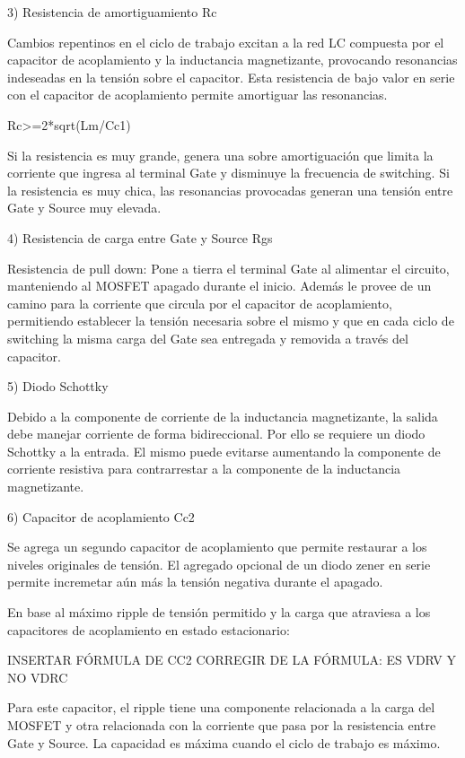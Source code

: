 3) Resistencia de amortiguamiento Rc

Cambios repentinos en el ciclo de trabajo excitan a la red LC compuesta por el capacitor de acoplamiento 
y la inductancia magnetizante, provocando resonancias indeseadas en la tensión sobre el capacitor. 
Esta resistencia de bajo valor en serie con el capacitor de acoplamiento permite amortiguar las resonancias. 

Rc>=2*sqrt(Lm/Cc1)

Si la resistencia es muy grande, genera una sobre amortiguación que limita la corriente que ingresa al terminal Gate y disminuye la frecuencia de switching. 
Si la resistencia es muy chica, las resonancias provocadas generan una tensión entre Gate y Source muy elevada.

4) Resistencia de carga entre Gate y Source Rgs

Resistencia de pull down: Pone a tierra el terminal Gate al alimentar el circuito, manteniendo al MOSFET apagado durante el inicio. 
Además le provee de un camino para la corriente que circula por el capacitor de acoplamiento, 
permitiendo establecer la tensión necesaria sobre el mismo y que en cada ciclo de switching 
la misma carga del Gate sea entregada y removida a través del capacitor. 

5) Diodo Schottky 

Debido a la componente de corriente de la inductancia magnetizante, la salida debe manejar corriente de forma bidireccional. 
Por ello se requiere un diodo Schottky a la entrada. 
El mismo puede evitarse aumentando la componente de corriente resistiva para contrarrestar a la componente de la inductancia magnetizante. 

6) Capacitor de acoplamiento Cc2  

Se agrega un segundo capacitor de acoplamiento que permite restaurar a los niveles originales de tensión. 
El agregado opcional de un diodo zener en serie permite incremetar aún más la tensión negativa durante el apagado. 

En base al máximo ripple de tensión permitido y la carga que atraviesa a los capacitores de acoplamiento en estado estacionario:

INSERTAR FÓRMULA DE CC2 
CORREGIR DE LA FÓRMULA: ES VDRV Y NO VDRC

Para este capacitor, el ripple tiene una componente relacionada a la carga del MOSFET 
y otra relacionada con la corriente que pasa por la resistencia entre Gate y Source. 
La capacidad es máxima cuando el ciclo de trabajo es máximo. 

